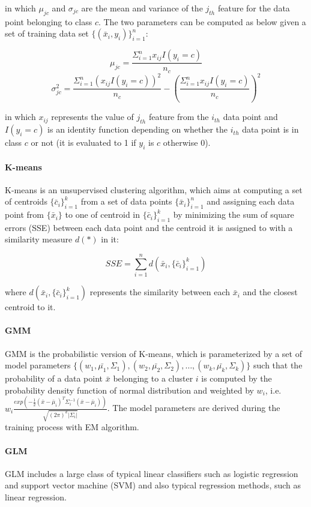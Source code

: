 in which $\mu_{jc}$ and $\sigma_{jc}$ are the mean and variance of the $j_{th}$ feature for the data point belonging to class $c$. The two parameters can be computed as below given a set of training data set $\{(\bar{x}_i, y_i)\}_{i=1}^n$:

\begin{equation}\label{eq: nb_mean}
    \mu_{jc} = \frac{\Sigma_{i=1}^nx_{ij}I(y_i=c)}{n_c}
\end{equation}
\begin{equation}\label{eq: nb_var}
    \sigma_{jc}^2 = \frac{\Sigma_{i=1}^n(x_{ij}I(y_i=c))^2}{n_c}-(\frac{\Sigma_{i=1}^nx_{ij}I(y_i=c)}{n_c})^2
\end{equation}

in which $x_{ij}$ represents the value of $j_{th}$ feature from the $i_{th}$ data point and $I(y_i=c)$ is an identity function depending on whether the $i_{th}$ data point is in class $c$ or not (it is evaluated to 1 if $y_i$ is $c$ otherwise 0).

\paragraph{K-means} K-means is an unsupervised clustering algorithm, which aims at computing a set of centroids $\{\bar{c}_i\}_{i=1}^k$ from a set of data points $\{\bar{x}_i\}_{i=1}^n$ and assigning each data point from $\{\bar{x}_i\}$ to one of centroid in $\{\bar{c}_i\}_{i=1}^k$ by minimizing the sum of square errors (SSE) between each data point and the centroid it is assigned to with a similarity measure $d(*)$ in it:

\begin{equation}\label{eq: sse_k_means}
    SSE = \sum_{i=1}^nd(\bar{x}_i, \{\bar{c}_i\}_{i=1}^k)
\end{equation}

where $d(\bar{x}_i, \{\bar{c}_i\}_{i=1}^k)$ represents the similarity between each $\bar{x}_i$ and the closest centroid to it.

\paragraph{GMM} GMM is the probabilistic version of K-means, which is parameterized by a set of model parameters $\{(w_1, \bar{\mu_1}, \Sigma_1), (w_2, \bar{\mu_2}, \Sigma_2), \dots, (w_k, \bar{\mu_k}, \Sigma_k)\}$ such that the probability of a data point $\bar{x}$ belonging to a cluster $i$ is computed by the probability density function of normal distribution and weighted by $w_i$, i.e.  $w_i\frac{exp(-\frac{1}{2}(\bar{x}-\bar{\mu}_i)^T\Sigma_i^{-1}(\bar{x}-\bar{\mu}_i))}{\sqrt{(2\pi)^k|\Sigma_i|}}$. The model parameters are derived during the training process with EM algorithm.

\paragraph{GLM} GLM includes a large class of typical linear classifiers such as logistic regression and support vector machine (SVM) and also typical regression methods, such as linear regression.